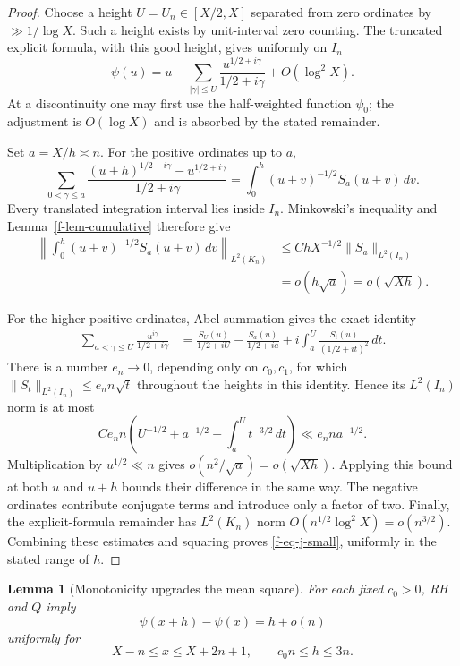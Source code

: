 \documentclass[11pt,a4paper]{article}
\newtheorem{lemma}[theorem]{Lemma}
\theoremstyle{definition}
\theoremstyle{remark}
\begin{document}
\begin{proof}
Choose a height $U=U_n\in[X/2,X]$ separated from zero ordinates by
$\gg1/\log X$.  Such a height exists by unit-interval zero counting.  The
truncated explicit formula, with this good height, gives uniformly on
$I_n$
\begin{equation}
 \psi(u)=u-\sum_{|\gamma|\le U}
 \frac{u^{1/2+i\gamma}}{1/2+i\gamma}+O(\log^2X).
 \label{f-eq-explicit-local}
\end{equation}
At a discontinuity one may first use the half-weighted function $\psi_0$;
the adjustment is $O(\log X)$ and is absorbed by the stated remainder.

Set $a=X/h\asymp n$.  For the positive ordinates up to $a$,
\[
 \sum_{0<\gamma\le a}
 \frac{(u+h)^{1/2+i\gamma}-u^{1/2+i\gamma}}{1/2+i\gamma}
 =\int_0^h(u+v)^{-1/2}S_a(u+v)\,dv.
\]
Every translated integration interval lies inside $I_n$.  Minkowski's
inequality and Lemma~\ref{f-lem-cumulative} therefore give
\begin{align*}
 \left\|\int_0^h(u+v)^{-1/2}S_a(u+v)\,dv\right\|_{L^2(K_n)}
 &\le C hX^{-1/2}\|S_a\|_{L^2(I_n)}\\
 &=o(h\sqrt a)=o(\sqrt{Xh}).
\end{align*}

For the higher positive ordinates, Abel summation gives the exact identity
\begin{align}
 \sum_{a<\gamma\le U}\frac{u^{i\gamma}}{1/2+i\gamma}
 &=\frac{S_U(u)}{1/2+iU}-\frac{S_a(u)}{1/2+ia}
 +i\int_a^U\frac{S_t(u)}{(1/2+it)^2}\,dt.
 \label{f-eq-abel-high}
\end{align}
There is a number $e_n\to0$, depending only on $c_0,c_1$, for which
$\|S_t\|_{L^2(I_n)}\le e_n n\sqrt t$ throughout the heights in this
identity.  Hence its $L^2(I_n)$ norm is at most
\[
 C e_n n\left(U^{-1/2}+a^{-1/2}+
 \int_a^Ut^{-3/2}\,dt\right)
 \ll e_n n a^{-1/2}.
\]
Multiplication by $u^{1/2}\ll n$ gives $o(n^2/\sqrt a)
=o(\sqrt{Xh})$.  Applying this bound at both $u$ and $u+h$ bounds their
difference in the same way.  The negative ordinates contribute conjugate
terms and introduce only a factor of two.  Finally, the explicit-formula
remainder has $L^2(K_n)$ norm $O(n^{1/2}\log^2X)=o(n^{3/2})$.
Combining these estimates and squaring proves
\eqref{f-eq-j-small}, uniformly in the stated range of $h$.
\end{proof}

\begin{lemma}[Monotonicity upgrades the mean square]
\label{f-lem-pointwise}
For each fixed $c_0>0$, RH and $Q$ imply
\begin{equation}
 \psi(x+h)-\psi(x)=h+o(n)
 \label{f-eq-pointwise-local}
\end{equation}
uniformly for
\[
 X-n\le x\le X+2n+1,\qquad c_0n\le h\le3n.
\]
\end{lemma}
\end{document}
